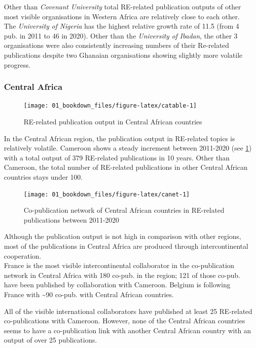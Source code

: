 \documentclass[
]{book}
\begin{document}
Other than \emph{Covenant University} total RE-related publication outputs of other most visible organisations in Western Africa are relatively close to each other. The \emph{University of Nigeria} has the highest relative growth rate of 11.5 (from 4 pub. in 2011 to 46 in 2020). Other than the \emph{University of Ibadan}, the other 3 organisations were also consistently increasing numbers of their Re-related publications despite two Ghanaian organisations showing slightly more volatile progress.

\hypertarget{central-africa}{%
\subsubsection{Central Africa}\label{central-africa}}

\begin{figure}
\texttt{[image: 01\_bookdown\_files/figure-latex/catable-1]} \caption{RE-related publication output in Central African countries}\label{fig:catable}
\end{figure}

In the Central African region, the publication output in RE-related topics is relatively volatile. Cameroon shows a steady increment between 2011-2020 (see \ref{fig:catable}) with a total output of 379 RE-related publications in 10 years. Other than Cameroon, the total number of RE-related publications in other Central African countries stays under 100.

\begin{figure}
\texttt{[image: 01\_bookdown\_files/figure-latex/canet-1]} \caption{Co-publication network of Central African countries in RE-related publications between 2011-2020}\label{fig:canet}
\end{figure}

Although the publication output is not high in comparison with other regions, most of the publications in Central Africa are produced through intercontinental cooperation.\\
France is the most visible intercontinental collaborator in the co-publication network in Central Africa with 180 co-pub. in the region; 121 of those co-pub. have been published by collaboration with Cameroon. Belgium is following France with \textasciitilde90 co-pub. with Central African countries.

All of the visible international collaborators have published at least 25 RE-related co-publications with Cameroon. However, none of the Central African countries seems to have a co-publication link with another Central African country with an output of over 25 publications.
\end{document}
